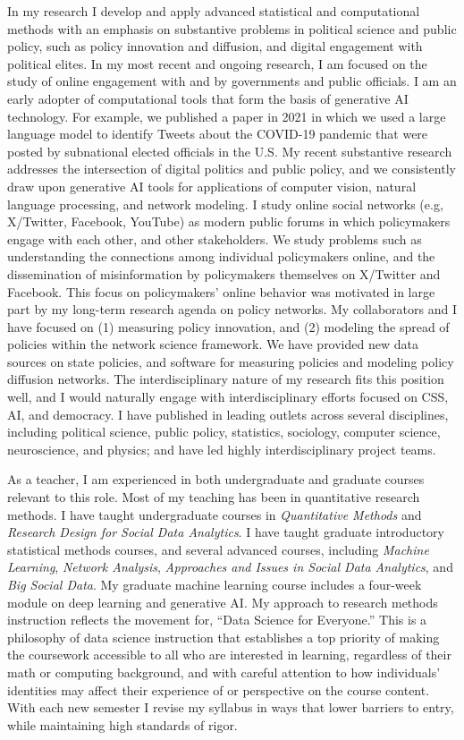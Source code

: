 \documentclass[a4paper,11pt]{letter}
\begin{document}
\begin{letter}
In my research I develop and apply advanced statistical and computational methods with an emphasis on substantive problems in political science and public policy, such as policy innovation and diffusion, and digital engagement with political elites. In my most recent and ongoing research, I am focused on the study of online engagement with and by governments and public officials. I am an early adopter of computational tools that form the basis of generative AI technology. For example, we published a paper in 2021 in which we used a large language model to identify Tweets about the COVID-19 pandemic that were posted by subnational elected officials in the U.S. My recent substantive research addresses the intersection of digital politics and public policy, and we consistently draw upon generative AI tools for applications of computer vision, natural language processing, and network modeling. I study online social networks (e.g, X/Twitter, Facebook, YouTube) as modern public forums in which policymakers engage with each other, and other stakeholders. We study problems such as understanding the connections among individual policymakers online, and the dissemination of misinformation by policymakers themselves on X/Twitter and Facebook. This focus on policymakers' online behavior was motivated in large part by my long-term research agenda on policy networks. My collaborators and I have focused on (1) measuring policy innovation, and (2) modeling the spread of policies within the network science framework. We have provided new data sources on state policies, and software for measuring policies and modeling policy diffusion networks.  The interdisciplinary nature of my research fits this position well, and I would naturally engage with interdisciplinary efforts focused on CSS, AI, and democracy. I have published in leading outlets across several disciplines, including political science, public policy, statistics, sociology, computer science, neuroscience, and physics; and have led highly interdisciplinary project teams. 


As a teacher, I am experienced in both undergraduate and graduate courses relevant to this role. Most of my teaching has been in quantitative research methods. I have taught undergraduate courses in {\em Quantitative Methods} and {\em Research Design for Social Data Analytics}. I have taught graduate introductory statistical methods courses, and several advanced courses, including {\em Machine Learning}, {\em Network Analysis}, {\em  Approaches and Issues in Social Data Analytics}, and {\em Big Social Data}.  My graduate machine learning course includes a four-week module on deep learning and generative AI.  My approach to research methods instruction reflects the movement for, ``Data Science for Everyone.'' This is a philosophy of data science instruction that establishes a top priority of making the coursework accessible to all who are interested in learning, regardless of their math or computing background, and with careful attention to how individuals' identities may affect their experience of or perspective on the course content. With each new semester I revise my syllabus in ways that lower barriers to entry, while maintaining high standards of rigor. 


\end{letter}
\end{document}

